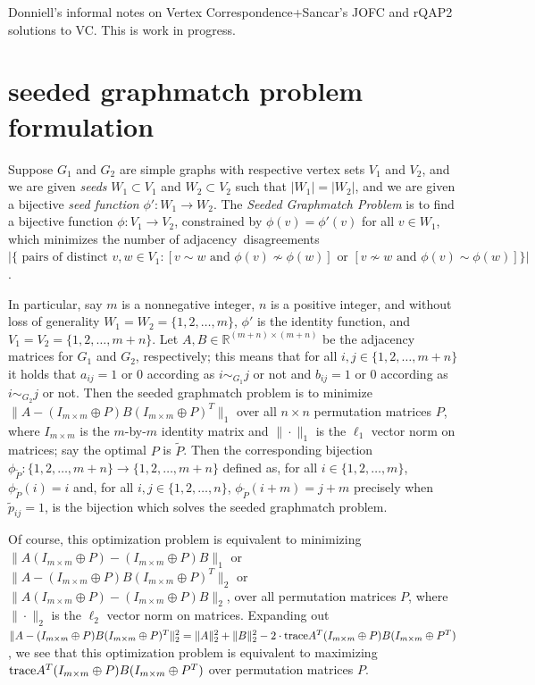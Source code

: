 \documentclass[12pt]{article}
\newcommand{\R}{\mathbb{R}}
\newcommand{\tr}{\textup{trace}}
\begin{document}
{\Large Donniell's informal notes on Vertex Correspondence+Sancar's JOFC and rQAP2 solutions to VC. This is work in progress.}

\section{seeded graphmatch problem formulation}
Suppose $G_1$ and $G_2$ are simple graphs with respective
vertex sets $V_1$ and $V_2$, and we are given
{\it seeds} $W_1 \subset V_1$ and $W_2 \subset V_2$ such that
$|W_1|=|W_2|$, and we are given a bijective {\it seed function}
$\phi':W_1 \rightarrow W_2$.
The {\it Seeded Graphmatch Problem} is to find a bijective function
$\phi:V_1 \rightarrow V_2$, constrained by $\phi(v)=\phi'(v)$ for all $v \in W_1$,
which minimizes the number of adjacency~disagreements $|\{ \mbox{ pairs of distinct }
v,w \in V_1 : [v \sim w \mbox{ and } \phi(v) \not \sim \phi(w)]
\mbox{ or }[v \not \sim w \mbox{ and } \phi(v) \sim \phi(w)] \}|$.

In particular, say $m$ is a nonnegative integer, $n$ is a positive integer,
and without loss of generality $W_1=W_2=\{1,2,\ldots,m \}$, $\phi'$ is the
identity function, and $V_1=V_2=\{1,2,\ldots,m+n\}$.
Let $A,B \in \R^{(m+n)\times (m+n)}$ be the adjacency matrices
for $G_1$ and $G_2$, respectively; this means that
for all $i,j \in \{1,2,\ldots,m+n\}$
it holds that $a_{ij}=1$ or $0$ according as $i \sim_{G_1} j$ or not
and  $b_{ij}=1$ or $0$ according as $i \sim_{G_2} j$ or not.
Then the seeded graphmatch problem is to
minimize $\|A-(I_{m \times m}\oplus P)B(I_{m \times m}\oplus P)^T\|_1$ over all $n \times n$ permutation matrices $P$, where $I_{m \times m}$ is the $m$-by-$m$
identity matrix and $\| \cdot \|_1$ is the $\ell_1$  vector norm on matrices;
say the optimal $P$ is $\tilde{P}$.
Then the corresponding bijection $\phi_{\tilde{P}}: \{1,2,\ldots,m+n\} \rightarrow \{1,2,\ldots,m+n\}$
defined as, for all $i \in \{1,2,\ldots,m\}$, $\phi_{\tilde{P}}(i)=i$ and,
for all $i,j \in \{1,2,\ldots,n\}$, $\phi_{\tilde{P}} (i+m)=j+m$ precisely when $\tilde{p}_{ij}=1$, is the bijection which solves the seeded graphmatch problem.

Of course, this optimization problem is equivalent to minimizing
$\|A(I_{m \times m}\oplus P)-(I_{m \times m}\oplus P)B\|_1$ or
$\|A-(I_{m \times m}\oplus P)B(I_{m \times m}\oplus P)^T\|_2$ or
$\|A(I_{m \times m}\oplus P)-(I_{m \times m}\oplus P)B\|_2$, over all
permutation matrices $P$,
where $\| \cdot \|_2$ is the $\ell_2$ vector norm on matrices.
Expanding out $\|A-(I_{m \times m}\oplus P)B(I_{m \times m}\oplus P)^T\|_2^2=
\|A\|_2^2 + \|B\|_2^2
- 2 \cdot \tr A^T(I_{m \times m}\oplus P)B(I_{m \times m}\oplus P^T)$,
we see that this optimization problem is equivalent to maximizing $\tr A^T(I_{m \times m}\oplus P)B(I_{m \times m}\oplus P^T)$
over permutation matrices $P$.
\end{document}
